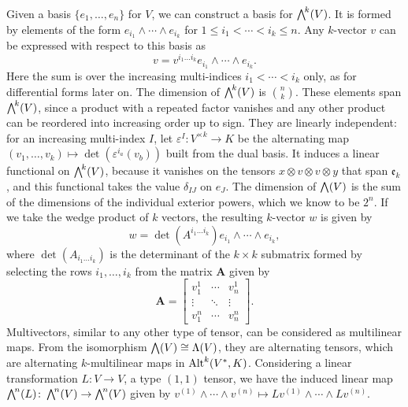 \documentclass[a4paper,12pt]{article}
\begin{document}
Given a basis $\{e_1, \ldots, e_n\}$ for $V$, we can construct a basis for $\extp^k(V)$.
It is formed by elements of the form $e_{i_1} \wedge \cdots \wedge e_{i_k}$ for $1 \leq i_1 < \cdots < i_k \leq n$.
Any $k$-vector $v$ can be expressed with respect to this basis as
\begin{equation}
    v = v^{i_1 \ldots i_k} e_{i_1} \wedge \cdots \wedge e_{i_k}.
\end{equation}
Here the sum is over the increasing multi-indices $i_1 < \cdots < i_k$ only, as for differential forms later on.
The dimension of $\extp^k(V)$ is $\binom{n}{k}$.
These elements span $\extp^k(V)$, since a product with a repeated factor vanishes and any other product can be reordered into increasing order up to sign.
They are linearly independent: for an increasing multi-index $I$, let $\varepsilon^I \colon V^{\times k} \to K$ be the alternating map $(v_1, \ldots, v_k) \mapsto \det(\varepsilon^{i_a}(v_b))$ built from the dual basis.
It induces a linear functional on $\extp^k(V)$, because it vanishes on the tensors $x \otimes v \otimes v \otimes y$ that span $\mathfrak{e}_k$, and this functional takes the value $\delta_{IJ}$ on $e_J$.
The dimension of $\extp(V)$ is the sum of the dimensions of the individual exterior powers, which we know to be $2^n$.
If we take the wedge product of $k$ vectors, the resulting $k$-vector $w$ is given by
\begin{equation}
    w = \det (A^{i_1 \ldots i_k}) e_{i_1} \wedge \cdots \wedge e_{i_k},
\end{equation}
where $\det(A_{i_1 \ldots i_k})$ is the determinant of the $k \times k$ submatrix formed by selecting the rows $i_1, \ldots, i_k$ from the matrix $\mathbf{A}$ given by
\begin{equation}
    \mathbf{A} = \begin{bmatrix}
v^1_1 & \cdots & v^1_n \\
\vdots & \ddots & \vdots \\
v^n_1 & \cdots & v^n_n 
\end{bmatrix}.
\end{equation}
Multivectors, similar to any other type of tensor, can be considered as multilinear maps.
From the isomorphism $\extp(V) \cong \Lambda(V)$, they are alternating tensors, which are alternating $k$-multilinear maps in $\operatorname{Alt}^k(V^*, K)$.
Considering a linear transformation $L \colon V \to V$, a type $(1, 1)$ tensor, we have the induced linear map $\extp^n(L) \colon \extp^n(V) \to \extp^n(V)$ given by $v^{(1)} \wedge \cdots \wedge v^{(n)} \mapsto Lv^{(1)} \wedge \cdots \wedge Lv^{(n)}$.
\end{document}
